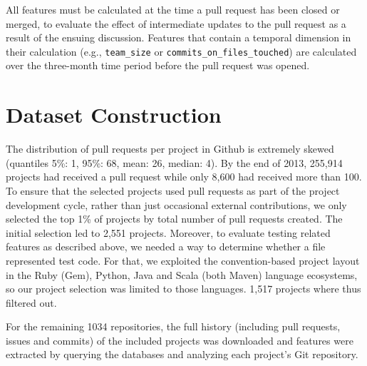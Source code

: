 \documentclass{sig-alternate}
\begin{document}
All features must be calculated at the time a pull request has been closed or
merged, to evaluate the effect of intermediate updates to the pull request as a
result of the ensuing discussion. Features that contain a temporal dimension in
their calculation (e.g., \texttt{team\_size} or
\texttt{commits\_on\_files\_touched}) are calculated over the three-month time
period before the pull request was opened.

\section{Dataset Construction}

The distribution of pull requests per project in Github is extremely skewed
(quantiles 5\%: 1, 95\%: 68, mean: 26, median: 4). By the end of 2013, 255,914
projects had received a pull request while only 8,600 had received more than
100. To ensure that the selected projects used pull requests as part of the
project development cycle, rather than just occasional external contributions,
we only selected the top 1\% of projects by total number of pull requests
created. The initial selection led to 2,551 projects.
Moreover, to evaluate testing related features as described above,
we needed a way to determine whether a file represented test code.
For that, we exploited the
convention-based project layout in the Ruby (Gem), Python, Java and Scala (both
Maven) language ecosystems, so our project selection was limited to those
languages. 1,517 projects where thus filtered out.

For the remaining 1034 repositories, the full history (including pull requests,
issues and commits) of the included projects was downloaded and features were
extracted by querying the \ghtorrent databases and analyzing each project's Git
repository.

%
%
\end{document}
